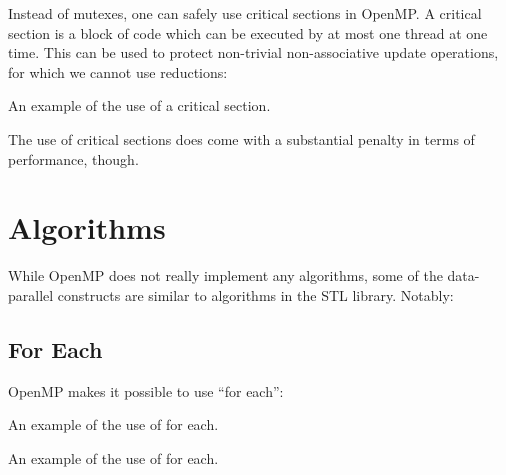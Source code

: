 Instead of mutexes, one can safely use critical sections in OpenMP. 
A critical section is a block of code which can be executed by at most 
one thread at one time.
This can be used to protect non-trivial non-associative update operations, 
for which we cannot use reductions: 

\raggedbottom
\begin{codebox}[]{\href{https://godbolt.org/z/YYeqYEdv3}{\ExternalLink}}
\footnotesize An example of the use of a critical section.
\tcblower
{}
\end{codebox}

The use of critical sections does come with a substantial penalty in terms of performance, though. 

\section{Algorithms}

While OpenMP does not really implement any algorithms, some of the data-parallel constructs are similar to algorithms in the STL library. Notably:

\subsection{For Each}

OpenMP makes it possible to use ``for each'':

\raggedbottom
\begin{codebox}[]{\href{https://godbolt.org/z/}{\ExternalLink}}
\footnotesize An example of the use of for each.
\tcblower
{}
\end{codebox}

\raggedbottom
\begin{codebox}[]{\href{https://godbolt.org/z/enK6dYEoW}{\ExternalLink}}
\footnotesize An example of the use of for each.
\tcblower
{}
\end{codebox}


